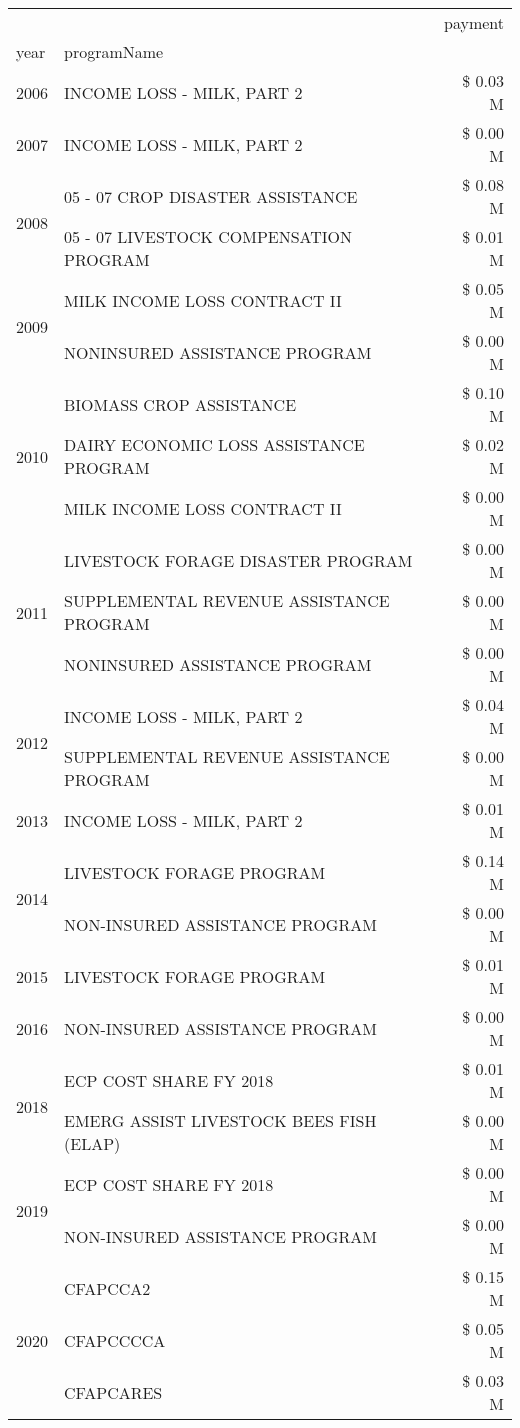 \begin{tabular}{llr}
\toprule
 &  & payment \\
year & programName &  \\
\midrule
2006 & INCOME LOSS - MILK, PART 2 & \$ 0.03 M \\
\cline{1-3}
2007 & INCOME LOSS - MILK, PART 2 & \$ 0.00 M \\
\cline{1-3}
\multirow[t]{2}{*}{2008} & 05 - 07 CROP DISASTER ASSISTANCE & \$ 0.08 M \\
 & 05 - 07 LIVESTOCK COMPENSATION PROGRAM & \$ 0.01 M \\
\cline{1-3}
\multirow[t]{2}{*}{2009} & MILK INCOME LOSS CONTRACT II & \$ 0.05 M \\
 & NONINSURED ASSISTANCE PROGRAM & \$ 0.00 M \\
\cline{1-3}
\multirow[t]{3}{*}{2010} & BIOMASS CROP ASSISTANCE & \$ 0.10 M \\
 & DAIRY ECONOMIC LOSS ASSISTANCE PROGRAM & \$ 0.02 M \\
 & MILK INCOME LOSS CONTRACT II & \$ 0.00 M \\
\cline{1-3}
\multirow[t]{3}{*}{2011} & LIVESTOCK FORAGE DISASTER PROGRAM & \$ 0.00 M \\
 & SUPPLEMENTAL REVENUE ASSISTANCE PROGRAM & \$ 0.00 M \\
 & NONINSURED ASSISTANCE PROGRAM & \$ 0.00 M \\
\cline{1-3}
\multirow[t]{2}{*}{2012} & INCOME LOSS - MILK, PART 2 & \$ 0.04 M \\
 & SUPPLEMENTAL REVENUE ASSISTANCE PROGRAM & \$ 0.00 M \\
\cline{1-3}
2013 & INCOME LOSS - MILK, PART 2 & \$ 0.01 M \\
\cline{1-3}
\multirow[t]{2}{*}{2014} & LIVESTOCK FORAGE PROGRAM & \$ 0.14 M \\
 & NON-INSURED ASSISTANCE PROGRAM & \$ 0.00 M \\
\cline{1-3}
2015 & LIVESTOCK FORAGE PROGRAM & \$ 0.01 M \\
\cline{1-3}
2016 & NON-INSURED ASSISTANCE PROGRAM                & \$ 0.00 M \\
\cline{1-3}
\multirow[t]{2}{*}{2018} & ECP COST SHARE FY 2018 & \$ 0.01 M \\
 & EMERG ASSIST LIVESTOCK BEES FISH (ELAP) & \$ 0.00 M \\
\cline{1-3}
\multirow[t]{2}{*}{2019} & ECP COST SHARE FY 2018 & \$ 0.00 M \\
 & NON-INSURED ASSISTANCE PROGRAM & \$ 0.00 M \\
\cline{1-3}
\multirow[t]{3}{*}{2020} & CFAPCCA2 & \$ 0.15 M \\
 & CFAPCCCCA & \$ 0.05 M \\
 & CFAPCARES & \$ 0.03 M \\
\cline{1-3}
\bottomrule
\end{tabular}
